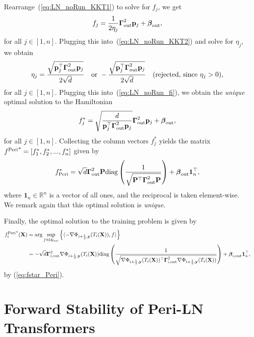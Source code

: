 \documentclass[journal]{IEEEtran}
\newcommand{\bfP}{{\bf P}}
\newcommand{\bfX}{{\bf X}}
\newcommand{\bfy}{ {\bf y}}
\newcommand{\bfp}{{\bf p}}
\newcommand{\bfGamma}{{\boldsymbol \Gamma}}
\newcommand{\bfbeta}{{\boldsymbol \beta}}
\theoremstyle{plain}
\theoremstyle{definition}
\theoremstyle{remark}
\begin{document}
Rearrange~(\ref{eq:LN_noRun_KKT1}) to solve for $f_j$, we get
\begin{equation}\label{eq:LN_noRun_fi}
   f_j = \frac{1}{2\eta_j} \bfGamma^{2}_{\rm out} \bfp_j + \bfbeta_{\rm out},
\end{equation}
for all $j\in[1,n]$. Plugging this into~(\ref{eq:LN_noRun_KKT2}) and solve for $\eta_j$, we obtain
\begin{equation}
    \eta_j = \frac{\sqrt{\bfp_j^\top \bfGamma^{2}_{\rm out} \bfp_j}}{2 \sqrt{d}} \quad \text{or } - \frac{\sqrt{\bfp_j^\top \bfGamma^{2}_{\rm out} \bfp_j}}{2 \sqrt{d}} \quad \text{(rejected, since $\eta_j>0$)},
\end{equation}
for all $j\in[1,n]$. Plugging this into~(\ref{eq:LN_noRun_fi}), we obtain the \emph{unique} optimal solution to the Hamiltonian
\begin{equation}\label{eq:fjstar_Peri}
    f_j^* = \sqrt{\frac{d}{\bfp_j^\top \bfGamma^{2}_{\rm out} \bfp_j}} \bfGamma^{2}_{\rm out}\bfp_j + \bfbeta_{\rm out},
\end{equation}
for all $j\in[1,n]$. Collecting the column vectors $f_j^*$ yields the matrix ${f^{\rm Peri}}^*=[f^*_1, f^*_2, ..., f^*_n]$ given by
\begin{equation}\label{eq:fstar_Peri}
    f^*_{\rm Peri} = \sqrt{d} \bfGamma^{2}_{\rm out} \bfP {\rm diag} \left( \frac{1}{\sqrt{\bfP^\top \bfGamma^{2}_{\rm out} \bfP}} \right) + \bfbeta_{\rm out} \mathbf{1}_n^\top,
\end{equation}
where $\mathbf{1}_n \in \mathbb{R}^n$ is a vector of all ones, 
and the reciprocal is taken element-wise. We remark again that this optimal solution is \emph{unique}.

Finally, the optimal solution to the training problem is given by
\begin{align}
    {f^{\rm Peri}_i}^*(\bfX) &= \arg \sup_{f \in \mathcal{U}_{\rm Peri}} \left\{\langle - \nabla \Phi_{{i+\frac{1}{2}, \bfy}}(T_i(\bfX)), f \rangle \right\}\\
    &= - \sqrt{d} \bfGamma_{i, {\rm out}}^{2} \nabla \Phi_{{i+\frac{1}{2}, \bfy}}(T_i(\bfX)) {\rm diag} \left( \frac{1}{\sqrt{\nabla \Phi_{{i+\frac{1}{2}, \bfy}}(T_i(\bfX))^\top \bfGamma_{i, {\rm out}}^{2} \nabla \Phi_{{i+\frac{1}{2}, \bfy}}(T_i(\bfX))}} \right) + \bfbeta_{i, \rm out} \mathbf{1}_n^\top, \label{eq:optimal_velocity_Peri}
\end{align}
by (\ref{eq:fstar_Peri}).

\section{Forward Stability of Peri-LN Transformers}
\end{document}
